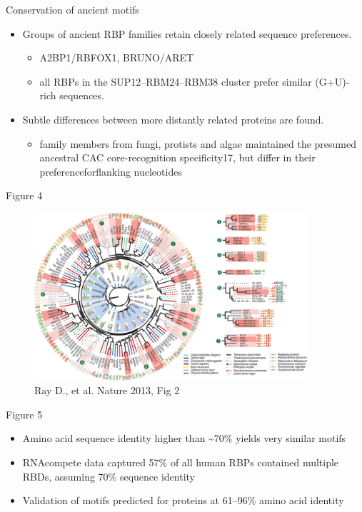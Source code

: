\documentclass[professionalfont, 12pt, default]{beamer}
\providecommand{\tightlist}{%
    \setlength{\itemsep}{0pt}\setlength{\parskip}{0pt}}
\begin{document}
\begin{frame}{Conservation of ancient motifs}

\begin{itemize}
\tightlist
\item
  Groups of ancient RBP families retain closely related sequence
  preferences.

  \begin{itemize}
  \tightlist
  \item
    A2BP1/RBFOX1, BRUNO/ARET
  \item
    all RBPs in the SUP12--RBM24--RBM38 cluster prefer similar
    (G+U)-rich sequences.
  \end{itemize}
\item
  Subtle differences between more distantly related proteins are found.

  \begin{itemize}
  \tightlist
  \item
    family members from fungi, protists and algae maintained the
    presumed ancestral CAC core-recognition specificity17, but differ in
    their preferenceforflanking nucleotides
  \end{itemize}
\end{itemize}

\end{frame}

\begin{frame}{Figure 4}

\begin{figure}
\centering
\includegraphics[width=0.90000\textwidth]{img/f2.jpg}
\caption{Ray D., et al. Nature 2013, Fig 2}
\end{figure}

\end{frame}

\begin{frame}{Figure 5}

\begin{itemize}
\tightlist
\item
  Amino acid sequence identity higher than \textasciitilde{}70\% yields
  very similar motifs
\item
  RNAcompete data captured 57\% of all human RBPs contained multiple
  RBDs, assuming 70\% sequence identity
\item
  Validation of motifs predicted for proteins at 61--96\% amino acid
  identity
\end{itemize}

\end{frame}
\end{document}
